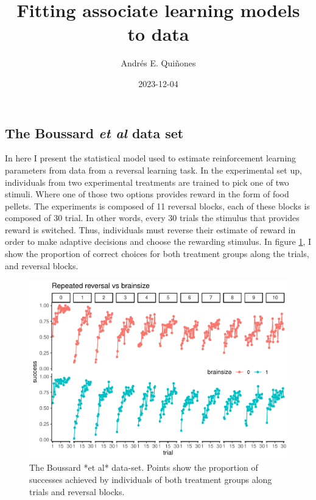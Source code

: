 \documentclass[
]{article}
\title{Fitting associate learning models to data}
\author{Andrés E. Quiñones}
\date{2023-12-04}
\begin{document}
\maketitle

\hypertarget{the-boussard-et-al-data-set}{%
\subsection{\texorpdfstring{The Boussard \emph{et al} data
set}{The Boussard et al data set}}\label{the-boussard-et-al-data-set}}

In here I present the statistical model used to estimate reinforcement
learning parameters from data from a reversal learning task. In the
experimental set up, individuals from two experimental treatments are
trained to pick one of two stimuli. Where one of those two options
provides reward in the form of food pellets. The experiments is composed
of 11 reversal blocks, each of these blocks is composed of 30 trial. In
other words, every 30 trials the stimulus that provides reward is
switched. Thus, individuals must reverse their estimate of reward in
order to make adaptive decisions and choose the rewarding stimulus. In
figure \ref{fig:plotBoussard}, I show the proportion of correct choices
for both treatment groups along the trials, and reversal blocks.

\begin{figure}

\includegraphics{report_files/figure-latex/plotBoussard-1} \hfill{}

\caption{The Boussard *et al* data-set. Points show the proportion of successes achieved by individuals of both treatment groups along trials and reversal blocks.}\label{fig:plotBoussard}
\end{figure}
\end{document}
